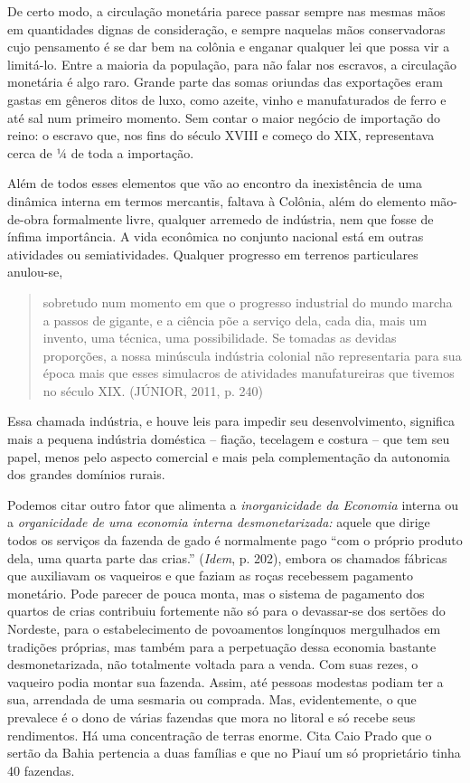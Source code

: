 De certo modo, a circulação monetária parece passar sempre nas mesmas
mãos em quantidades dignas de consideração, e sempre naquelas mãos
conservadoras cujo pensamento é se dar bem na colônia e enganar qualquer
lei que possa vir a limitá-lo. Entre a maioria da população, para não
falar nos escravos, a circulação monetária é algo raro. Grande parte das
somas oriundas das exportações eram gastas em gêneros ditos de luxo,
como azeite, vinho e manufaturados de ferro e até sal num primeiro
momento. Sem contar o maior negócio de importação do reino: o escravo
que, nos fins do século XVIII e começo do XIX, representava cerca de ¼
de toda a importação.

Além de todos esses elementos que vão ao encontro da inexistência de uma
dinâmica interna em termos mercantis, faltava à Colônia, além do
elemento mão-de-obra formalmente livre, qualquer arremedo de indústria,
nem que fosse de ínfima importância. A vida econômica no conjunto
nacional está em outras atividades ou semiatividades. Qualquer progresso
em terrenos particulares anulou-se,

\begin{quote}
sobretudo num momento em que o progresso industrial do mundo marcha a
passos de gigante, e a ciência põe a serviço dela, cada dia, mais um
invento, uma técnica, uma possibilidade. Se tomadas as devidas
proporções, a nossa minúscula indústria colonial não representaria para
sua época mais que esses simulacros de atividades manufatureiras que
tivemos no século XIX. (JÚNIOR, 2011, p. 240)
\end{quote}

Essa chamada indústria, e houve leis para impedir seu desenvolvimento,
significa mais a pequena indústria doméstica -- fiação, tecelagem e
costura -- que tem seu papel, menos pelo aspecto comercial e mais pela
complementação da autonomia dos grandes domínios rurais.

Podemos citar outro fator que alimenta a \emph{inorganicidade da
Economia} interna ou a \emph{organicidade de uma economia interna
desmonetarizada:} aquele que dirige todos os serviços da fazenda de gado
é normalmente pago ``com o próprio produto dela, uma quarta parte das
crias.'' (\emph{Idem}, p. 202), embora os chamados fábricas que
auxiliavam os vaqueiros e que faziam as roças recebessem pagamento
monetário. Pode parecer de pouca monta, mas o sistema de pagamento dos
quartos de crias contribuiu fortemente não só para o devassar-se dos
sertões do Nordeste, para o estabelecimento de povoamentos longínquos
mergulhados em tradições próprias, mas também para a perpetuação dessa
economia bastante desmonetarizada, não totalmente voltada para a venda.
Com suas rezes, o vaqueiro podia montar sua fazenda. Assim, até pessoas
modestas podiam ter a sua, arrendada de uma sesmaria ou comprada. Mas,
evidentemente, o que prevalece é o dono de várias fazendas que mora no
litoral e só recebe seus rendimentos. Há uma concentração de terras
enorme. Cita Caio Prado que o sertão da Bahia pertencia a duas famílias
e que no Piauí um só proprietário tinha 40 fazendas.

